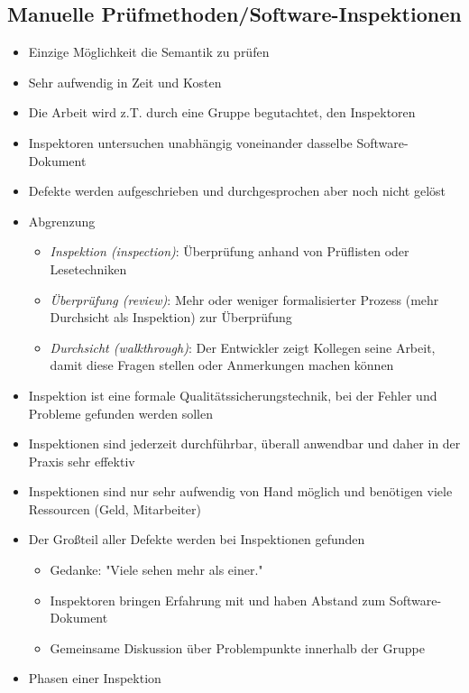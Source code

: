 \documentclass{article}
\begin{document}
\subsection{Manuelle Prüfmethoden/Software-Inspektionen}
\begin{itemize}
  \item Einzige Möglichkeit die Semantik zu prüfen
  \item Sehr aufwendig in Zeit und Kosten
  \item Die Arbeit wird z.T. durch eine Gruppe begutachtet, den Inspektoren
  \item Inspektoren untersuchen unabhängig voneinander dasselbe Software-Dokument
  \item Defekte werden aufgeschrieben und durchgesprochen aber noch nicht gelöst
  \item Abgrenzung
  \begin{itemize}
    \item \textit{Inspektion (inspection)}: Überprüfung anhand von Prüflisten oder Lesetechniken
    \item \textit{Überprüfung (review)}: Mehr oder weniger formalisierter Prozess (mehr Durchsicht als Inspektion) zur Überprüfung
    \item \textit{Durchsicht (walkthrough)}: Der Entwickler zeigt Kollegen seine Arbeit, damit diese Fragen stellen oder Anmerkungen machen können
  \end{itemize}
  \item Inspektion ist eine formale Qualitätssicherungstechnik, bei der Fehler und Probleme gefunden werden sollen
  \item Inspektionen sind jederzeit durchführbar, überall anwendbar und daher in der Praxis sehr effektiv
  \item Inspektionen sind nur sehr aufwendig von Hand möglich und benötigen viele Ressourcen (Geld, Mitarbeiter)
  \item Der Großteil aller Defekte werden bei Inspektionen gefunden
  \begin{itemize}
    \item Gedanke: "Viele sehen mehr als einer."
    \item Inspektoren bringen Erfahrung mit und haben Abstand zum Software-Dokument
    \item Gemeinsame Diskussion über Problempunkte innerhalb der Gruppe
  \end{itemize}
  \item Phasen einer Inspektion
  \begin{itemize}

\end{itemize}
\end{itemize}
\end{document}
